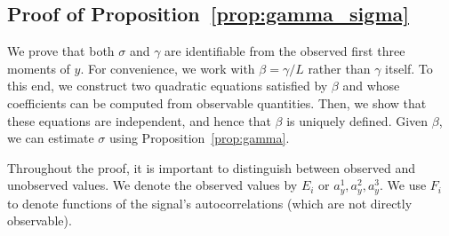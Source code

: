 \documentclass[12pt]{article}
\newcommand{\1}{\mathbf{1}}
\theoremstyle{plain}
\theoremstyle{definition}
\theoremstyle{remark}
\theoremstyle{plain}
\theoremstyle{remark}
\theoremstyle{plain}
\theoremstyle{plain}
\theoremstyle{plain}
\numberwithin{equation}{section}
\begin{document}
\subsection{Proof of Proposition~\ref{prop:gamma_sigma}} \label{sec:proof_prop_gamma_sigma}

We prove that both $\sigma$ and $\gamma$ are identifiable from the observed first three moments of $y$. For convenience, we work with $\beta = \gamma / L$ rather than $\gamma$ itself. To this end, we construct two quadratic equations satisfied by $\beta$ and whose coefficients can be computed from observable quantities. Then, we show that these equations are independent, and hence that $\beta$ is uniquely defined. Given $\beta$, we can estimate $\sigma$ using Proposition~\ref{prop:gamma}.

Throughout the proof, it is important to distinguish between observed and unobserved values.
We denote the observed values by $E_i$ or $a_y^1,a_y^2,a_y^3$. We use $F_i$ to denote functions of the signal's autocorrelations (which are not directly observable).
\end{document}
